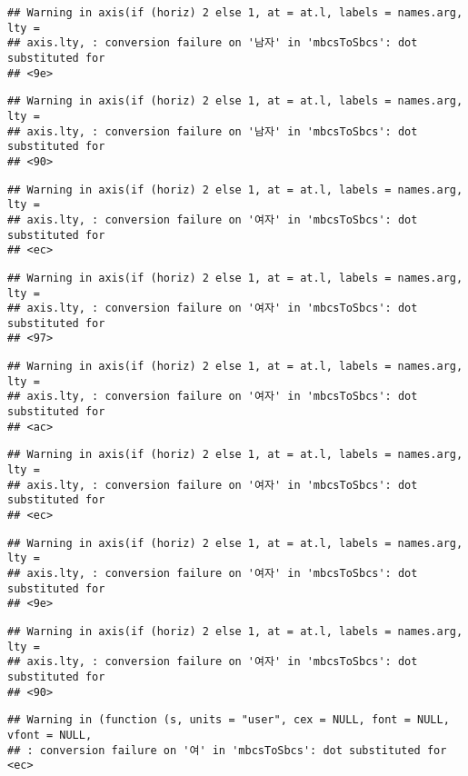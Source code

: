 \documentclass[
]{article}
\begin{document}
\begin{verbatim}
## Warning in axis(if (horiz) 2 else 1, at = at.l, labels = names.arg, lty =
## axis.lty, : conversion failure on '남자' in 'mbcsToSbcs': dot substituted for
## <9e>
\end{verbatim}

\begin{verbatim}
## Warning in axis(if (horiz) 2 else 1, at = at.l, labels = names.arg, lty =
## axis.lty, : conversion failure on '남자' in 'mbcsToSbcs': dot substituted for
## <90>
\end{verbatim}

\begin{verbatim}
## Warning in axis(if (horiz) 2 else 1, at = at.l, labels = names.arg, lty =
## axis.lty, : conversion failure on '여자' in 'mbcsToSbcs': dot substituted for
## <ec>
\end{verbatim}

\begin{verbatim}
## Warning in axis(if (horiz) 2 else 1, at = at.l, labels = names.arg, lty =
## axis.lty, : conversion failure on '여자' in 'mbcsToSbcs': dot substituted for
## <97>
\end{verbatim}

\begin{verbatim}
## Warning in axis(if (horiz) 2 else 1, at = at.l, labels = names.arg, lty =
## axis.lty, : conversion failure on '여자' in 'mbcsToSbcs': dot substituted for
## <ac>
\end{verbatim}

\begin{verbatim}
## Warning in axis(if (horiz) 2 else 1, at = at.l, labels = names.arg, lty =
## axis.lty, : conversion failure on '여자' in 'mbcsToSbcs': dot substituted for
## <ec>
\end{verbatim}

\begin{verbatim}
## Warning in axis(if (horiz) 2 else 1, at = at.l, labels = names.arg, lty =
## axis.lty, : conversion failure on '여자' in 'mbcsToSbcs': dot substituted for
## <9e>
\end{verbatim}

\begin{verbatim}
## Warning in axis(if (horiz) 2 else 1, at = at.l, labels = names.arg, lty =
## axis.lty, : conversion failure on '여자' in 'mbcsToSbcs': dot substituted for
## <90>
\end{verbatim}

\begin{verbatim}
## Warning in (function (s, units = "user", cex = NULL, font = NULL, vfont = NULL,
## : conversion failure on '여' in 'mbcsToSbcs': dot substituted for <ec>
\end{verbatim}
\end{document}
